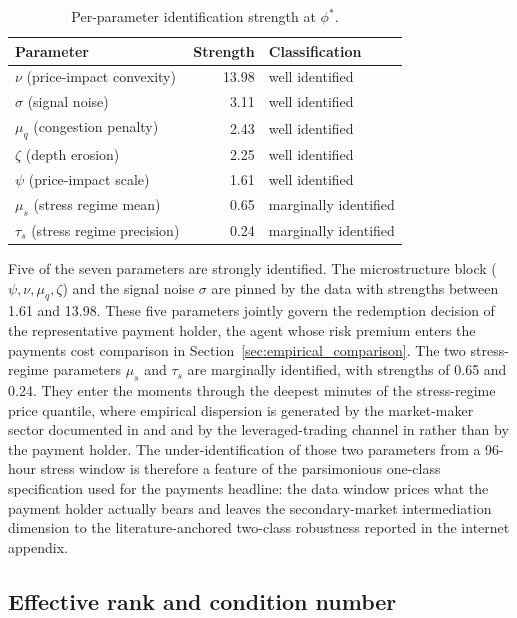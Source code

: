 \begin{table}[H]
\centering
\caption{Per-parameter identification strength at $\phi^*$.}\label{tab:identification}
\begin{tabular}{lrl}
\toprule
Parameter & Strength & Classification \\
\midrule
$\nu$ (price-impact convexity)  & 13.98 & well identified \\
$\sigma$ (signal noise)          & 3.11  & well identified \\
$\mu_q$ (congestion penalty)     & 2.43  & well identified \\
$\zeta$ (depth erosion)          & 2.25  & well identified \\
$\psi$ (price-impact scale)      & 1.61  & well identified \\
$\mu_s$ (stress regime mean)     & 0.65  & marginally identified \\
$\tau_s$ (stress regime precision) & 0.24 & marginally identified \\
\bottomrule
\end{tabular}
\end{table}

Five of the seven parameters are strongly identified. The microstructure block ($\psi, \nu, \mu_q, \zeta$) and the signal noise $\sigma$ are pinned by the data with strengths between 1.61 and 13.98. These five parameters jointly govern the redemption decision of the representative payment holder, the agent whose risk premium enters the payments cost comparison in Section~\ref{sec:empirical_comparison}. The two stress-regime parameters $\mu_s$ and $\tau_s$ are marginally identified, with strengths of 0.65 and 0.24. They enter the moments through the deepest minutes of the stress-regime price quantile, where empirical dispersion is generated by the market-maker sector documented in \citet{ma_zeng_zhang_2025} and \citet{lyons_viswanath_natraj_2023} and by the leveraged-trading channel in \citet{gorton_klee_ross_ross_vardoulakis_2026} rather than by the payment holder. The under-identification of those two parameters from a 96-hour stress window is therefore a feature of the parsimonious one-class specification used for the payments headline: the data window prices what the payment holder actually bears and leaves the secondary-market intermediation dimension to the literature-anchored two-class robustness reported in the internet appendix.

\subsection{Effective rank and condition number}\label{sub:svd}

